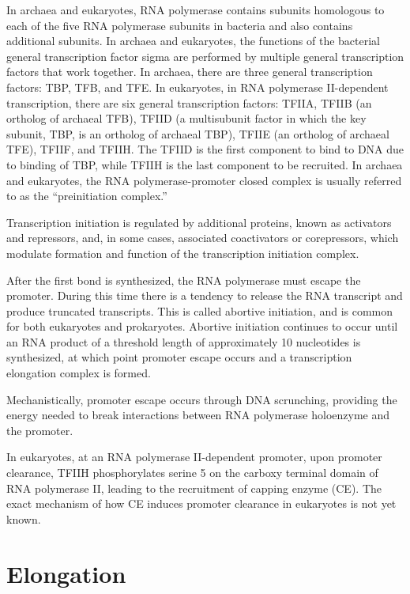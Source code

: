 In archaea and eukaryotes, RNA polymerase contains subunits homologous to each of the five RNA polymerase subunits in bacteria and also contains additional subunits. In archaea and eukaryotes, the functions of the bacterial general transcription factor sigma are performed by multiple general transcription factors that work together. In archaea, there are three general transcription factors: TBP, TFB, and TFE. In eukaryotes, in RNA polymerase II-dependent transcription, there are six general transcription factors: TFIIA, TFIIB (an ortholog of archaeal TFB), TFIID (a multisubunit factor in which the key subunit, TBP, is an ortholog of archaeal TBP), TFIIE (an ortholog of archaeal TFE), TFIIF, and TFIIH. The TFIID is the first component to bind to DNA due to binding of TBP, while TFIIH is the last component to be recruited. In archaea and eukaryotes, the RNA polymerase-promoter closed complex is usually referred to as the ``preinitiation complex.''

Transcription initiation is regulated by additional proteins, known as activators and repressors, and, in some cases, associated coactivators or corepressors, which modulate formation and function of the transcription initiation complex.

After the first bond is synthesized, the RNA polymerase must escape the promoter. During this time there is a tendency to release the RNA transcript and produce truncated transcripts. This is called abortive initiation, and is common for both eukaryotes and prokaryotes. Abortive initiation continues to occur until an RNA product of a threshold length of approximately 10 nucleotides is synthesized, at which point promoter escape occurs and a transcription elongation complex is formed.

Mechanistically, promoter escape occurs through DNA scrunching, providing the energy needed to break interactions between RNA polymerase holoenzyme and the promoter.

In eukaryotes, at an RNA polymerase II-dependent promoter, upon promoter clearance, TFIIH phosphorylates serine 5 on the carboxy terminal domain of RNA polymerase II, leading to the recruitment of capping enzyme (CE). The exact mechanism of how CE induces promoter clearance in eukaryotes is not yet known.

\hypertarget{elongation-2}{%
\section{Elongation}\label{elongation-2}}


